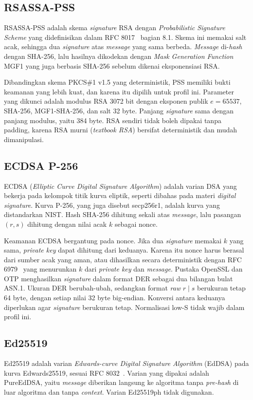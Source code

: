 \subsection{RSASSA-PSS}
RSASSA-PSS adalah skema \textit{signature} RSA dengan \textit{Probabilistic Signature Scheme} yang
didefinisikan dalam RFC 8017~\cite{rfc8017} bagian 8.1. Skema ini memakai salt acak, sehingga dua \textit{signature} atas \textit{message} yang sama berbeda. \textit{Message} di-\textit{hash} dengan SHA-256, lalu hasilnya
dikodekan dengan \textit{Mask Generation Function} MGF1 yang juga berbasis SHA-256 sebelum
dikenai eksponensiasi RSA.

Dibandingkan skema PKCS\#1 v1.5 yang deterministik, PSS memiliki bukti keamanan yang lebih
kuat, dan karena itu dipilih untuk profil ini. Parameter yang dikunci adalah modulus RSA 3072
bit dengan eksponen publik $e = 65537$, SHA-256, MGF1-SHA-256, dan salt 32 byte. Panjang
\textit{signature} sama dengan panjang modulus, yaitu 384 byte. RSA sendiri tidak boleh dipakai
tanpa padding, karena RSA murni (\textit{textbook RSA}) bersifat deterministik dan mudah
dimanipulasi.

\subsection{ECDSA P-256}
ECDSA (\textit{Elliptic Curve Digital Signature Algorithm}) adalah varian DSA yang bekerja pada
kelompok titik kurva eliptik, seperti dibahas pada materi \textit{digital signature}. Kurva P-256,
yang juga disebut secp256r1, adalah kurva yang distandarkan NIST. Hash SHA-256 dihitung sekali
atas \textit{message}, lalu pasangan $(r, s)$ dihitung dengan nilai acak $k$ sebagai nonce.

Keamanan ECDSA bergantung pada nonce. Jika dua \textit{signature} memakai $k$ yang sama, \textit{private key} dapat dihitung dari keduanya. Karena itu nonce harus berasal dari sumber acak yang aman,
atau dihasilkan secara deterministik dengan RFC 6979~\cite{rfc6979} yang menurunkan $k$ dari \textit{private key} dan
\textit{message}. Pustaka OpenSSL dan OTP menghasilkan \textit{signature} dalam format DER sebagai dua bilangan
bulat ASN.1. Ukuran DER berubah-ubah, sedangkan format \textit{raw} $r \mid s$ berukuran tetap
64 byte, dengan setiap nilai 32 byte big-endian. Konversi antara keduanya diperlukan agar
\textit{signature} berukuran tetap. Normalisasi low-S tidak wajib dalam profil ini.

\subsection{Ed25519}
Ed25519 adalah varian \textit{Edwards-curve Digital Signature Algorithm} (EdDSA) pada kurva
Edwards25519, sesuai RFC 8032~\cite{rfc8032}. Varian yang dipakai adalah PureEdDSA, yaitu \textit{message} diberikan
langsung ke algoritma tanpa \textit{pre-hash} di luar algoritma dan tanpa \textit{context}.
Varian Ed25519ph tidak digunakan.

